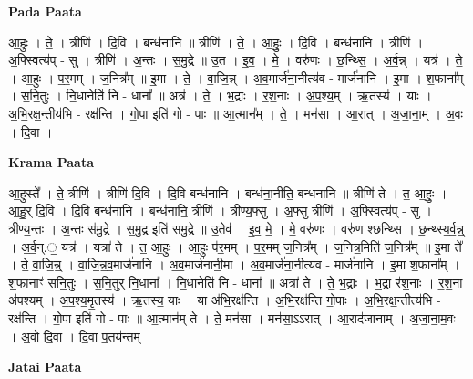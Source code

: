 \documentclass[17pt]{extarticle}
\begin{document}
\textbf{Pada Paata} \newline

आ॒हुः । ते॒ । त्रीणि॑ । दि॒वि । बन्ध॑नानि ॥ त्रीणि॑ । ते॒ । आ॒हुः॒ । दि॒वि । बन्ध॑नानि । त्रीणि॑ । अ॒फ्स्वित्य॑प् - सु । त्रीणि॑ । अ॒न्तः । स॒मु॒द्रे ॥ उ॒त । इ॒व॒ । मे॒ । वरु॑णः । छ॒न्थ्सि॒ । अ॒र्व॒न्न् । यत्र॑ । ते॒ । आ॒हुः । प॒र॒मम् । ज॒नित्र᳚म् ॥ इ॒मा । ते॒ । वा॒जि॒न्न् । अ॒व॒मार्ज॑ना॒नीत्य॑व - मार्ज॑नानि । इ॒मा । श॒फाना᳚म् । स॒नि॒तुः । नि॒धानेति॑ नि - धाना᳚ ॥ अत्र॑ । ते॒ । भ॒द्राः । र॒श॒नाः । अ॒प॒श्य॒म् । ऋ॒तस्य॑ । याः । अ॒भि॒रक्ष॒न्तीय॑भि - रक्ष॑न्ति । गो॒पा इति॑ गो - पाः ॥ आ॒त्मान᳚म् । ते॒ । मन॑सा । आ॒रात् । अ॒जा॒ना॒म् । अ॒वः । दि॒वा ।  \newline


\textbf{Krama Paata} \newline

आ॒हुस्ते᳚ । ते॒ त्रीणि॑ । त्रीणि॑ दि॒वि । दि॒वि बन्ध॑नानि । बन्ध॑ना॒नीति॒ बन्ध॑नानि ॥ त्रीणि॑ ते । त॒ आ॒हुः॒ । आ॒हु॒र् दि॒वि । दि॒वि बन्ध॑नानि । बन्ध॑नानि॒ त्रीणि॑ । त्रीण्य॒फ्सु । अ॒फ्सु त्रीणि॑ । अ॒फ्स्वित्य॑प् - सु । त्रीण्य॒न्तः । अ॒न्तः स॑मु॒द्रे । स॒मु॒द्र इति॑ समु॒द्रे ॥ उ॒तेव॑ । इ॒व॒ मे॒ । मे॒ वरु॑णः । वरु॑ण श्छन्थ्सि । छ॒न्थ्स्य॒र्व॒न्न्॒ । अ॒र्व॒न्.॒ यत्र॑ । यत्रा॑ ते । त॒ आ॒हुः । आ॒हुः प॑र॒मम् । प॒र॒मम् ज॒नित्र᳚म् । ज॒नित्र॒मिति॑ ज॒नित्र᳚म् ॥ इ॒मा ते᳚ । ते॒ वा॒जि॒न्न्॒ । वा॒जि॒न्न॒व॒मार्ज॑नानि । अ॒व॒मार्ज॑नानी॒मा । अ॒व॒मार्ज॑ना॒नीत्य॑व - मार्ज॑नानि । इ॒मा श॒फाना᳚म् । श॒फानाꣳ॑ सनि॒तुः । स॒नि॒तुर् नि॒धाना᳚ । नि॒धानेति॑ नि - धाना᳚ ॥ अत्रा॑ ते । ते॒ भ॒द्राः । भ॒द्रा र॑श॒नाः । र॒श॒ना अ॑पश्यम् । अ॒प॒श्य॒मृ॒तस्य॑ । ऋ॒तस्य॒ याः । या अ॑भि॒रक्ष॑न्ति । अ॒भि॒रक्ष॑न्ति गो॒पाः । अ॒भि॒रक्ष॒न्तीत्य॑भि - रक्ष॑न्ति । गो॒पा इति॑ गो - पाः ॥ आ॒त्मान॑म् ते । ते॒ मन॑सा । मन॑सा॒ऽऽरात् । आ॒राद॑जानाम् । अ॒जा॒ना॒म॒वः । अ॒वो दि॒वा । दि॒वा प॒तय॑न्तम् \newline

\textbf{Jatai Paata} \newline
\end{document}
